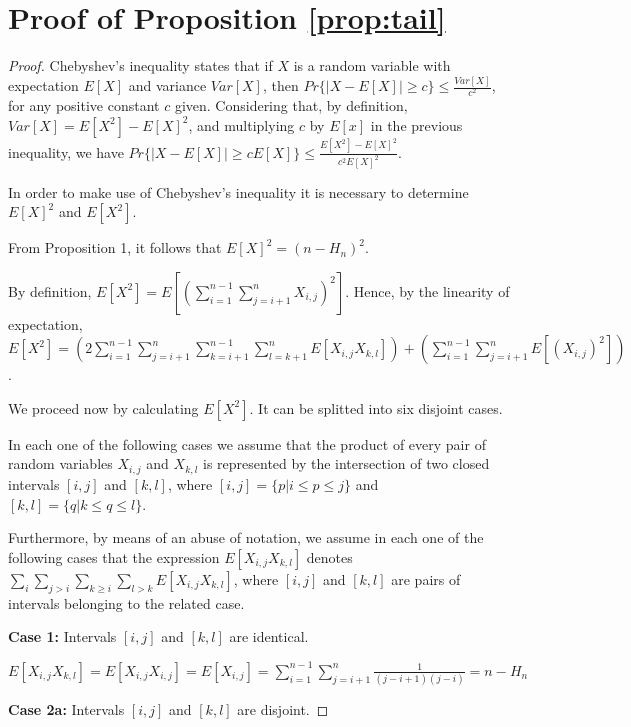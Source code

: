 \documentclass[12pt]{article}
\begin{document}
\section{Proof of Proposition \ref{prop:tail}}
\begin{proof}

\noindent Chebyshev's inequality states that if $X$ is a random variable with expectation $E[X]$ and variance $Var[X]$,
then $Pr\{ |X - E[X]| \geq c \} \leq \frac{Var[X]}{c^2}$, for any positive constant $c$ given.
Considering that, by definition,  $Var[X] = E[X^2] - E[X]^2$, and multiplying $c$ by $E[x]$ in the previous inequality, we have
$Pr\{ |X - E[X]| \geq c E[X] \} \leq \frac{E[X^2] - E[X]^2}{c^2 E[X]^2}$.

In order to make use of Chebyshev's inequality it is necessary to determine $E[X]^2$ and  $E[X^2]$.

From Proposition 1, it follows that $E[X]^2 = (n - H_{n})^2$.

By definition, $E[X^2] = E [( \sum\limits_{i=1}^{n-1} \sum\limits_{j=i+1}^{n} X_{i,j})^2]$.
Hence, by the linearity of expectation, $E[X^2] = ( 2 \sum\limits_{i=1}^{n-1} \sum\limits_{j=i+1}^{n}
\sum\limits_{k=i+1}^{n-1} \sum\limits_{l=k+1}^{n} E[X_{i,j} X_{k,l}] ) +
( \sum\limits_{i=1}^{n-1} \sum\limits_{j=i+1}^{n} E[(X_{i,j})^2] )$.


We proceed now by calculating $E[X^2]$. It can be splitted into six disjoint cases.

In each one of the following cases we assume that the product of every pair  
of random variables $X_{i,j}$ and $X_{k,l}$  is represented by the intersection
of two closed intervals $[i,j]$ and $[k,l]$, where $[i,j] = \{p | i \leq p \leq j \}$
and $[k,l] = \{q | k \leq q \leq l \}$.

Furthermore, by means of an abuse of notation, we assume in each one of the following cases that
the expression $E[X_{i,j} X_{k,l}]$ denotes $\sum\limits_{i}\sum\limits_{j >i}\sum\limits_{k \geq i}\sum\limits_{l > k} E[X_{i,j} X_{k,l}]$, where $[i,j]$ and $[k,l]$ are pairs of intervals belonging to the related case.


{\bf Case 1:} Intervals  $[i, j]$ and $[k, l]$ are identical.

$E[X_{i,j} X_{k,l}] = E[X_{i,j} X_{i,j}] = E[X_{i,j}] = \sum\limits_{i=1}^{n-1} \sum\limits_{j=i+1}^{n}
\frac{1}{(j-i+1)(j-i)} = n - H_n$

\vspace{0.5cm}


{\bf Case 2a:} Intervals  $[i, j]$ and $[k, l]$ are disjoint.


\end{proof}
\end{document}
